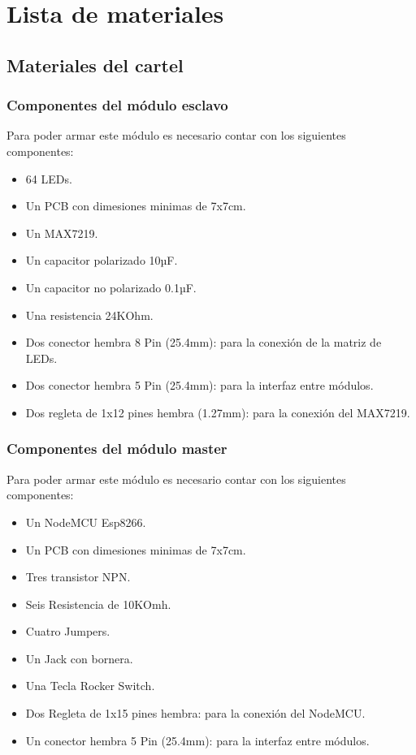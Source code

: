 \section{Lista de materiales}

\subsection{Materiales del cartel}

\subsubsection{Componentes del módulo esclavo}
Para poder armar este módulo es necesario contar con los siguientes componentes:
\begin{itemize}
    \item 64 LEDs.
    \item Un PCB con dimesiones minimas de 7x7cm.
    \item Un MAX7219.
    \item Un capacitor polarizado 10µF.
    \item Un capacitor no polarizado 0.1µF.
    \item Una resistencia 24KOhm.
    \item Dos conector hembra 8 Pin (25.4mm): para la conexión de la matriz de LEDs.
    \item Dos conector hembra 5 Pin (25.4mm): para la interfaz entre módulos.
    \item Dos regleta de 1x12 pines hembra (1.27mm): para la conexión del MAX7219.
\end{itemize}    

\subsubsection{Componentes del módulo master}
Para poder armar este módulo es necesario contar con los siguientes componentes:
\begin{itemize}
    \item Un NodeMCU Esp8266.
    \item Un PCB con dimesiones minimas de 7x7cm.
    \item Tres transistor NPN.
    \item Seis Resistencia de 10KOmh.
    \item Cuatro Jumpers.
    \item Un Jack con bornera.
    \item Una Tecla Rocker Switch.
    \item Dos Regleta de 1x15 pines hembra: para la conexión del NodeMCU.
    \item Un conector hembra 5 Pin (25.4mm): para la interfaz entre módulos.
\end{itemize}

